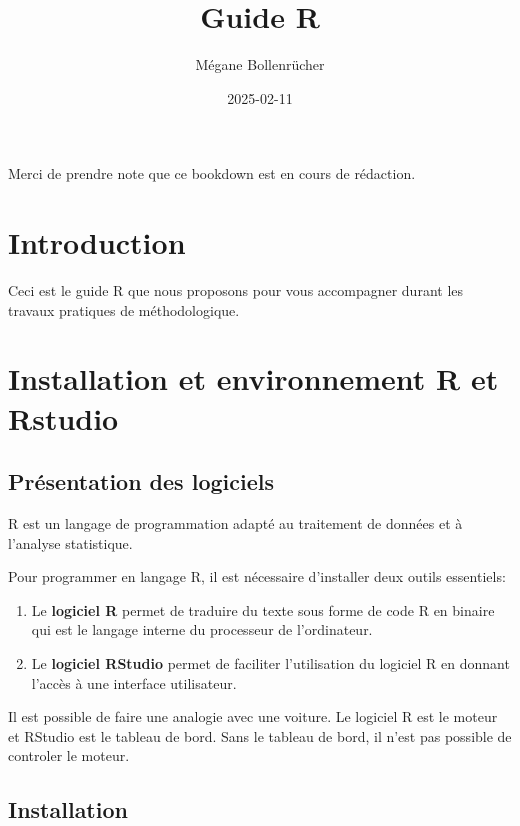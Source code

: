 \documentclass[
]{book}
\title{Guide R}
\author{Mégane Bollenrücher}
\date{2025-02-11}
\providecommand{\tightlist}{%
  \setlength{\itemsep}{0pt}\setlength{\parskip}{0pt}}
\begin{document}
\maketitle

{
\setcounter{tocdepth}{1}
\tableofcontents
}
Merci de prendre note que ce bookdown est en cours de rédaction.

\chapter{Introduction}\label{introduction}

Ceci est le guide R que nous proposons pour vous accompagner durant les travaux pratiques de méthodologique.

\chapter{Installation et environnement R et Rstudio}\label{installation-et-environnement-r-et-rstudio}

\section{Présentation des logiciels}\label{pruxe9sentation-des-logiciels}

R est un langage de programmation adapté au traitement de données et à l'analyse statistique.

Pour programmer en langage R, il est nécessaire d'installer deux outils essentiels:

\begin{enumerate}
\def\labelenumi{\arabic{enumi}.}
\tightlist
\item
  Le \textbf{logiciel R} permet de traduire du texte sous forme de code R en binaire qui est le langage interne du processeur de l'ordinateur.
\item
  Le \textbf{logiciel RStudio} permet de faciliter l'utilisation du logiciel R en donnant l'accès à une interface utilisateur.
\end{enumerate}

Il est possible de faire une analogie avec une voiture. Le logiciel R est le moteur et RStudio est le tableau de bord. Sans le tableau de bord, il n'est pas possible de controler le moteur.

\section{Installation}\label{installation}
\end{document}
